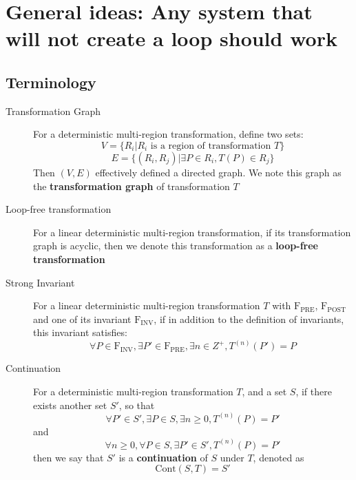 \documentclass[letterpaper,]{article}
\begin{document}
\hypertarget{general-ideas-any-system-that-will-not-create-a-loop-should-work}{%
\section{General ideas: Any system that will not create a loop should
work}\label{general-ideas-any-system-that-will-not-create-a-loop-should-work}}

\hypertarget{terminology-1}{%
\subsection{Terminology}\label{terminology-1}}

\begin{description}
\item[Transformation Graph]
For a deterministic multi-region transformation, define two sets:
\[V = \{R_i | R_i \text{ is a region of transformation }T\}\]
\[E = \{ (R_i, R_j) | \exists P \in R_i, T(P) \in R_j \} \] Then
\((V,E)\) effectively defined a directed graph. We note this graph as
the \textbf{transformation graph} of transformation \(T\)
\item[Loop-free transformation]
For a linear deterministic multi-region transformation, if its
transformation graph is acyclic, then we denote this transformation as a
\textbf{loop-free transformation}
\item[Strong Invariant]
For a linear deterministic multi-region transformation \(T\) with
\(\mathrm{F_{PRE}}\), \(\mathrm{F_{POST}}\) and one of its invariant
\(\mathrm{F_{INV}}\), if in addition to the definition of invariants,
this invariant satisfies:
\[\forall P \in \mathrm{F_{INV}}, \exists P' \in \mathrm{F_{PRE}}, \exists n \in Z^{+}, T^{(n)}(P') = P\]
\item[Continuation]
For a deterministic multi-region transformation \(T\), and a set \(S\),
if there exists another set \(S'\), so that
\[\forall P' \in S', \exists P \in S, \exists n \ge 0, T^{(n)}(P) = P'\]
and
\[\forall n \ge 0, \forall P \in S, \exists P' \in S', T^{(n)}(P) = P'\]
then we say that \(S'\) is a \textbf{continuation} of \(S\) under \(T\),
denoted as \[\mathrm{Cont}(S, T) = S'\]


\end{description}
\end{document}
